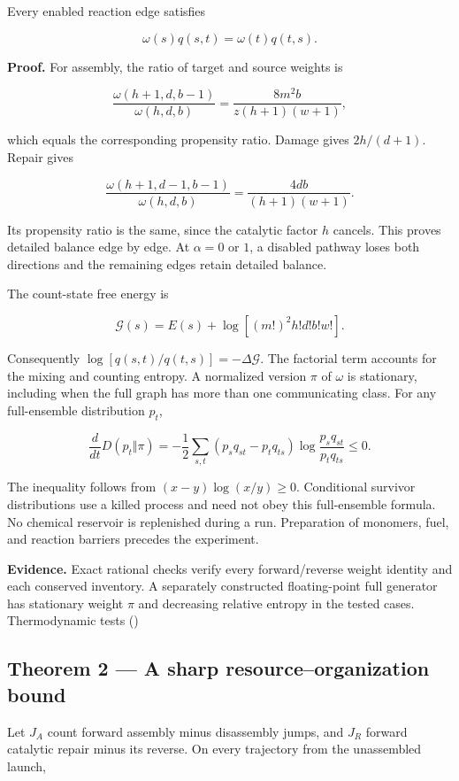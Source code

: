 \documentclass[
  11pt,
]{article}
\begin{document}
Every enabled reaction edge satisfies

\[
\omega(s)q(s,t)=\omega(t)q(t,s).
\]

\textbf{Proof.} For assembly, the ratio of target and source weights is

\[
\frac{\omega(h+1,d,b-1)}{\omega(h,d,b)}
=\frac{8m^2b}{z(h+1)(w+1)},
\]

which equals the corresponding propensity ratio. Damage gives
\(2h/(d+1)\). Repair gives

\[
\frac{\omega(h+1,d-1,b-1)}{\omega(h,d,b)}
=\frac{4db}{(h+1)(w+1)}.
\]

Its propensity ratio is the same, since the catalytic factor \(h\)
cancels. This proves detailed balance edge by edge. At \(\alpha=0\) or
\(1\), a disabled pathway loses both directions and the remaining edges
retain detailed balance.

The count-state free energy is

\[
\mathcal G(s)=E(s)+\log[(m!)^2h!d!b!w!].
\]

Consequently \(\log[q(s,t)/q(t,s)]=-\Delta\mathcal G\). The factorial
term accounts for the mixing and counting entropy. A normalized version
\(\pi\) of \(\omega\) is stationary, including when the full graph has
more than one communicating class. For any full-ensemble distribution
\(p_t\),

\[
\frac{d}{dt}D(p_t\Vert\pi)
=-\frac12\sum_{s,t}(p_sq_{st}-p_tq_{ts})
\log\frac{p_sq_{st}}{p_tq_{ts}}\le0.
\]

The inequality follows from \((x-y)\log(x/y)\ge0\). Conditional survivor
distributions use a killed process and need not obey this full-ensemble
formula. No chemical reservoir is replenished during a run. Preparation
of monomers, fuel, and reaction barriers precedes the experiment.

\textbf{Evidence.} Exact rational checks verify every forward/reverse
weight identity and each conserved inventory. A separately constructed
floating-point full generator has stationary weight \(\pi\) and
decreasing relative entropy in the tested cases. Thermodynamic tests
()

\subsection{Theorem 2 --- A sharp resource--organization
bound}\label{theorem-2-a-sharp-resourceorganization-bound}

Let \(J_A\) count forward assembly minus disassembly jumps, and \(J_R\)
forward catalytic repair minus its reverse. On every trajectory from the
unassembled launch,
\end{document}
